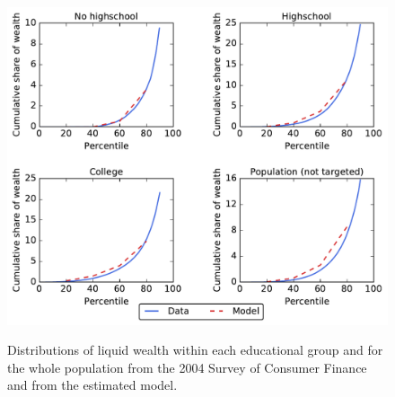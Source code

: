 \documentclass[11pt]{article}
\begin{document}
\begin{figure}[th]
	\begin{center}
	\includegraphics[width=.9\textwidth]{LorenzPoints.pdf}
	\label{fig:LorenzPts}
	\caption{Distributions of liquid wealth within each educational group and for the whole population from the 2004 Survey of Consumer Finance and from the estimated model.}
	\end{center}
\end{figure}

\let\bibfont=\small
%


\end{document}
